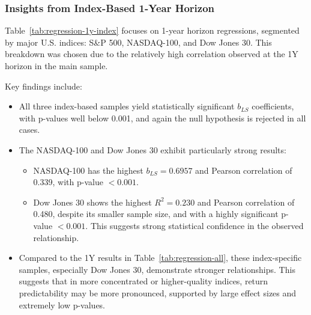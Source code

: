 \documentclass[11pt]{article}
\begin{document}
\subsubsection{Insights from Index-Based 1-Year Horizon}

Table~\ref{tab:regression-1y-index} focuses on 1-year horizon regressions, segmented by major U.S. indices: S\&P 500, NASDAQ-100, and Dow Jones 30. This breakdown was chosen due to the relatively high correlation observed at the 1Y horizon in the main sample.

Key findings include:

\begin{itemize}
    \item All three index-based samples yield statistically significant $b_{LS}$ coefficients, with p-values well below 0.001, and again the null hypothesis is rejected in all cases.

    \item The NASDAQ-100 and Dow Jones 30 exhibit particularly strong results:
        \begin{itemize}
            \item NASDAQ-100 has the highest $b_{LS} = 0.6957$ and Pearson correlation of 0.339, with p-value $<0.001$.
            \item Dow Jones 30 shows the highest $R^2 = 0.230$ and Pearson correlation of 0.480, despite its smaller sample size, and with a highly significant p-value $<0.001$. This suggests strong statistical confidence in the observed relationship.
        \end{itemize}

    \item Compared to the 1Y results in Table~\ref{tab:regression-all}, these index-specific samples, especially Dow Jones 30, demonstrate stronger relationships. This suggests that in more concentrated or higher-quality indices, return predictability may be more pronounced, supported by large effect sizes and extremely low p-values.
\end{itemize}
\end{document}
